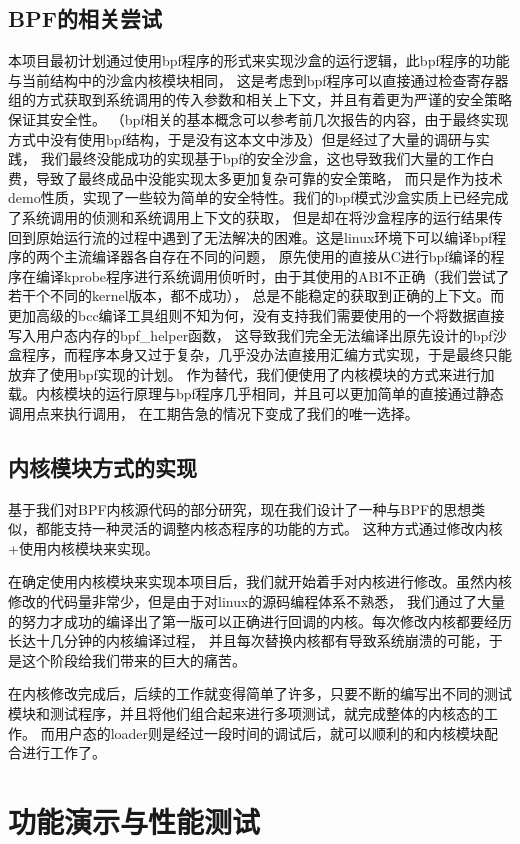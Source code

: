 \documentclass[AutoFakeBold,a4paper]{ctexart}
\begin{document}
\subsection{BPF的相关尝试}
本项目最初计划通过使用bpf程序的形式来实现沙盒的运行逻辑，此bpf程序的功能与当前结构中的沙盒内核模块相同，
这是考虑到bpf程序可以直接通过检查寄存器组的方式获取到系统调用的传入参数和相关上下文，并且有着更为严谨的安全策略保证其安全性。
（bpf相关的基本概念可以参考前几次报告的内容，由于最终实现方式中没有使用bpf结构，于是没有这本文中涉及）但是经过了大量的调研与实践，
我们最终没能成功的实现基于bpf的安全沙盒，这也导致我们大量的工作白费，导致了最终成品中没能实现太多更加复杂可靠的安全策略，
而只是作为技术demo性质，实现了一些较为简单的安全特性。我们的bpf模式沙盒实质上已经完成了系统调用的侦测和系统调用上下文的获取，
但是却在将沙盒程序的运行结果传回到原始运行流的过程中遇到了无法解决的困难。这是linux环境下可以编译bpf程序的两个主流编译器各自存在不同的问题，
原先使用的直接从C进行bpf编译的程序在编译kprobe程序进行系统调用侦听时，由于其使用的ABI不正确（我们尝试了若干个不同的kernel版本，都不成功），
总是不能稳定的获取到正确的上下文。而更加高级的bcc编译工具组则不知为何，没有支持我们需要使用的一个将数据直接写入用户态内存的bpf\_helper函数，
这导致我们完全无法编译出原先设计的bpf沙盒程序，而程序本身又过于复杂，几乎没办法直接用汇编方式实现，于是最终只能放弃了使用bpf实现的计划。
作为替代，我们便使用了内核模块的方式来进行加载。内核模块的运行原理与bpf程序几乎相同，并且可以更加简单的直接通过静态调用点来执行调用，
在工期告急的情况下变成了我们的唯一选择。

\subsection{内核模块方式的实现}
基于我们对BPF内核源代码的部分研究，现在我们设计了一种与BPF的思想类似，都能支持一种灵活的调整内核态程序的功能的方式。
这种方式通过修改内核+使用内核模块来实现。

在确定使用内核模块来实现本项目后，我们就开始着手对内核进行修改。虽然内核修改的代码量非常少，但是由于对linux的源码编程体系不熟悉，
我们通过了大量的努力才成功的编译出了第一版可以正确进行回调的内核。每次修改内核都要经历长达十几分钟的内核编译过程，
并且每次替换内核都有导致系统崩溃的可能，于是这个阶段给我们带来的巨大的痛苦。  

在内核修改完成后，后续的工作就变得简单了许多，只要不断的编写出不同的测试模块和测试程序，并且将他们组合起来进行多项测试，就完成整体的内核态的工作。
而用户态的loader则是经过一段时间的调试后，就可以顺利的和内核模块配合进行工作了。

\section{功能演示与性能测试}
\end{document}
